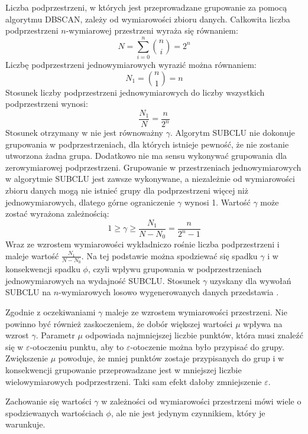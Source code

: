 Liczba podprzestrzeni, w których jest przeprowadzane grupowanie za pomocą algorytmu DBSCAN, zależy od wymiarowości zbioru danych. Całkowita liczba podprzestrzeni $ n $-wymiarowej przestrzeni wyraża się równaniem:
\begin{equation}
	N = \displaystyle\sum_{i=0}^{n} \binom{n}{i} = 2^n
\end{equation}
Liczbę podprzestrzeni jednowymiarowych wyrazić można równaniem:
\begin{equation}
	N_1 = \binom{n}{1} = n
\end{equation}
Stosunek liczby podprzestrzeni jednowymiarowych do liczby wszystkich podprzestrzeni wynosi:
\begin{equation}
	\label{eq:odc:subspaces-to-subspaces-1d-count-ratio}
	\frac{N_1}{N} = \frac{n}{2^n}
\end{equation}
Stosunek otrzymany w   nie jest równoważny $ \gamma $. Algorytm SUBCLU nie dokonuje grupowania w podprzestrzeniach, dla których istnieje pewność, że nie zostanie utworzona żadna grupa. Dodatkowo nie ma sensu wykonywać grupowania dla zerowymiarowej podprzestrzeni. Grupowanie w przestrzeniach jednowymiarowych w algorytmie SUBCLU jest zawsze wykonywane, a niezależnie od wymiarowości zbioru danych mogą nie istnieć grupy dla podprzestrzeni więcej niż jednowymiarowych, dlatego górne ograniczenie $ \gamma $ wynosi 1. Wartość $ \gamma $ może zostać wyrażona zależnością:
\begin{equation}
	\label{eq:odc:subclu_1d_nd_subspaces_count_ratio}
	1 \ge \gamma \ge \frac{N_1}{N-N_0} = \frac{n}{2^n-1}
\end{equation}
Wraz ze wzrostem wymiarowości wykładniczo rośnie liczba podprzestrzeni i maleje wartość $ \frac{N_1}{N-N_0} $. Na tej podstawie można spodziewać się spadku $ \gamma $ i w konsekwencji spadku $ \phi $, czyli wpływu grupowania w podprzestrzeniach jednowymiarowych na wydajność SUBCLU. Stosunek $ \gamma $ uzyskany dla wywołań SUBCLU na $ n $-wymiarowych losowo wygenerowanych danych przedstawia .



Zgodnie z oczekiwaniami $ \gamma $ maleje ze wzrostem wymiarowości przestrzeni. Nie powinno być również zaskoczeniem, że dobór większej wartości $ \mu $ wpływa na wzrost $ \gamma $. Parametr $ \mu $ odpowiada najmniejszej liczbie punktów, która musi znaleźć się w $ \varepsilon $-otoczeniu punktu, aby to $ \varepsilon $-otoczenie można było przypisać do grupy. Zwiększenie $ \mu $ powoduje, że mniej punktów zostaje przypisanych do grup i w konsekwencji grupowanie przeprowadzane jest w mniejszej liczbie wielowymiarowych podprzestrzeni. Taki sam efekt dałoby zmniejszenie $ \varepsilon $.\par
Zachowanie się wartości $ \gamma $ w zależności od wymiarowości przestrzeni mówi wiele o spodziewanych wartościach $ \phi $, ale nie jest jedynym czynnikiem, który je warunkuje. 


